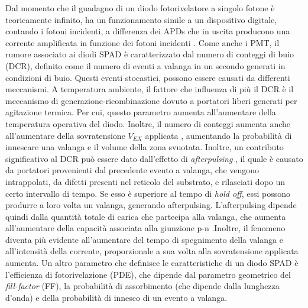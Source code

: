 Dal momento che il guadagno di un diodo fotorivelatore a singolo fotone è teoricamente infinito, ha un funzionamento simile a un dispositivo digitale, contando i fotoni incidenti, a differenza dei APDs che in uscita producono una corrente amplificata in funzione dei fotoni incidenti \cite{Jiang2019}. Come anche i PMT, il rumore associato ai diodi SPAD è caratterizzato dal numero di conteggi di buio (DCR), definito come il numero di eventi a valanga in un secondo generati in condizioni di buio. Questi eventi stocastici, possono essere causati da differenti meccanismi. A temperatura ambiente, il fattore che influenza di più il DCR è il meccanismo di generazione-ricombinazione dovuto a portatori liberi generati per agitazione termica. Per cui, questo parametro aumenta all'aumentare della temperatura operativa del diodo. Inoltre, il numero di conteggi aumenta anche all'aumentare della sovratensione $V_{EX}$ applicata \cite{DiFranco2002}, aumentando la probabilità di innescare una valanga e il volume della zona svuotata. Inoltre, un contributo significativo al DCR può essere dato dall'effetto di \textit{afterpulsing} \cite{DiFranco2002}, il quale è causato da portatori provenienti dal precedente evento a valanga, che vengono intrappolati, da difetti presenti nel reticolo del substrato, e rilasciati dopo un certo intervallo di tempo. Se esso è superiore al tempo di \textit{hold off}, essi possono produrre a loro volta un valanga, generando afterpulsing. L'afterpulsing dipende quindi dalla quantità totale di carica che partecipa alla valanga, che aumenta all'aumentare della capacità associata alla giunzione p-n \cite{Palubiak2011}.Inoltre, il fenomeno diventa più evidente all'aumentare del tempo di spegnimento della valanga e all'intensità della corrente, proporzionale a sua volta alla sovratensione applicata aumenta. Un altro parametro che definisce le caratteristiche di un diodo SPAD è l'efficienza di fotorivelazione (PDE), che dipende dal parametro geometrico del \textit{fill-factor} (FF), la probabilità di assorbimento (che dipende dalla lunghezza d'onda) e della probabilità di innesco di un evento a valanga.

